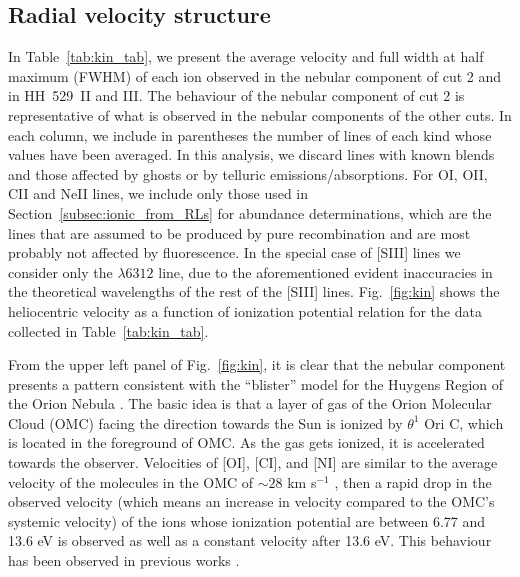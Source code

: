 \documentclass[fleqn,usenatbib]{mnras}
\begin{document}
\subsection{Radial velocity structure}
\label{subsec:vel_struc}

In Table~\ref{tab:kin_tab}, we present the average velocity and full width at half maximum (FWHM) of each ion observed in the nebular component of cut 2 and in HH~529~II and III. The behaviour of the nebular component of cut 2 is representative of what is observed in the nebular components of the other cuts. In each column, we include in parentheses the number of lines of each kind whose values have been averaged. In this analysis, we discard lines with known blends and those affected by ghosts or by telluric emissions/absorptions. For \mbox{O}\thinspace \mbox{I}, \mbox{O}\thinspace \mbox{II}, \mbox{C}\thinspace \mbox{II}  and \mbox{Ne}\thinspace \mbox{II} lines, we include only those used in Section~\ref{subsec:ionic_from_RLs} for abundance determinations, which are the lines that are assumed to be produced by pure recombination and are most probably not affected by fluorescence. In the special case of \mbox{[S}\thinspace \mbox{III]} lines we consider only the $\lambda 6312$ line, due to the aforementioned evident inaccuracies in the theoretical wavelengths of the rest of the \mbox{[S}\thinspace \mbox{III]} lines. Fig.~\ref{fig:kin} shows the heliocentric velocity as a function of ionization potential relation for the data collected in Table~\ref{tab:kin_tab}. 

From the upper left panel of Fig.~\ref{fig:kin}, it is clear that the nebular component presents a pattern consistent with the ``blister'' model for the Huygens Region of the Orion Nebula \citep[and references therein]{Odell01,Ferland01,Odell20}. The basic idea is that a layer of gas of the Orion Molecular Cloud (OMC) facing the direction towards the Sun is ionized by $\theta^{1}$ Ori C, which is located in the foreground of OMC. As the gas gets ionized, it is accelerated towards the observer. Velocities of \mbox{[O}\thinspace \mbox{I]}, \mbox{[C}\thinspace \mbox{I]}, and \mbox{[N}\thinspace \mbox{I]} are similar to the average velocity of the molecules in the OMC of $\sim 28$ km s$^{-1}$ \citep[][and references therein]{goudis82, odell18}, then a rapid drop in the observed velocity (which means an increase in velocity compared to the OMC's systemic velocity) of the ions whose ionization potential are between 6.77 and 13.6 eV is observed as well as a constant velocity after 13.6 eV. This behaviour has been observed in previous works  \citep{Kaler67, Fehrenbach77, odell92, Esteban99}. 
\end{document}
